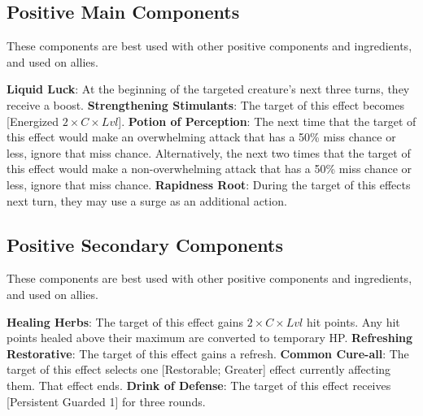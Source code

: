 \begin{multicols*}{2}
\subsection*{Positive Main Components}
\label{alchposmain}
These components are best used with other positive components and ingredients, and used on allies.
\begin{itemize}
\thing \textbf{Liquid Luck}: At the beginning of the targeted creature’s next three turns, they receive a boost.
\thing \textbf{Strengthening Stimulants}: The target of this effect becomes [Energized $2\times C\times Lvl$].
\thing \textbf{Potion of Perception}: The next time that the target of this effect would make an overwhelming attack that has a 50\% miss chance or less, ignore that miss chance. Alternatively, the next two times that the target of this effect would make a non-overwhelming attack that has a 50\% miss chance or less, ignore that miss chance.
\thing \textbf{Rapidness Root}: During the target of this effects next turn, they may use a surge as an additional action.
\end{itemize}

\subsection*{Positive Secondary Components}
\label{alchpossec}
These components are best used with other positive components and ingredients, and used on allies.
\begin{itemize}
\thing \textbf{Healing Herbs}: The target of this effect gains $2\times C\times Lvl$ hit points. Any hit points healed above their maximum are converted to temporary HP.
\thing \textbf{Refreshing Restorative}: The target of this effect gains a refresh.
\thing \textbf{Common Cure-all}: The target of this effect selects one [Restorable; Greater] effect currently affecting them. That effect ends.
\thing \textbf{Drink of Defense}: The target of this effect receives [Persistent Guarded 1] for three rounds.
\end{itemize}


\end{multicols*}

